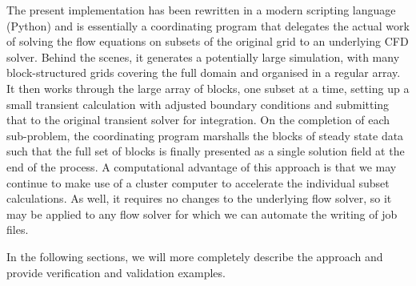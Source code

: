 \documentclass[12pt,a4paper,twoside]{article}
\begin{document}
\medskip
The present implementation has been rewritten in a modern scripting language (Python) 
and is essentially a coordinating program that delegates the actual work 
of solving the flow equations on subsets of the original grid to an underlying CFD solver.  
Behind the scenes, it generates a potentially large simulation, 
with many block-structured grids covering the full domain and organised in a regular array.  
It then works through the large array of blocks, one subset at a time, 
setting up a small transient calculation with adjusted boundary conditions and 
submitting that to the original transient solver for integration.  
On the completion of each sub-problem, the coordinating program marshalls the blocks 
of steady state data such that the full set of blocks is finally presented 
as a single solution field at the end of the process.  
A computational advantage of this approach is that we may continue to make use 
of a cluster computer to accelerate the individual subset calculations.  
As well, it requires no changes to the underlying flow solver, 
so it may be applied to any flow solver for which we can automate the writing of job files. 

\medskip
In the following sections, we will more completely describe the approach 
and provide verification and validation examples.  
\end{document}
